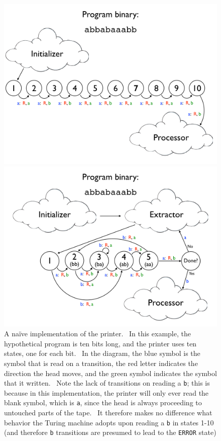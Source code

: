 \documentclass[11pt]{article}
\begin{document}
\begin{figure}
\begin{center}
\includegraphics[scale=0.28]{figs/naiveprog.png}
\caption{A na\"ive implementation of the printer. \ In this example, the hypothetical program is ten bits long, and the printer uses ten states, one for each bit. \ In the diagram, the blue symbol is the symbol that is read on a transition, the red letter indicates the direction the head moves, and the green symbol indicates the symbol that it written. \ Note the lack of transitions on reading a \texttt{b}; this is because in this implementation, the printer will only ever read the blank symbol, which is \texttt{a}, since the head is always proceeding to untouched parts of the tape. \ It therefore makes no difference what behavior the Turing machine adopts upon reading a \texttt{b} in states 1-10 (and therefore \texttt{b} transitions are presumed to lead to the \texttt{ERROR} state) \label{fig:naiveprog}}
\includegraphics[scale=0.28]{figs/introspectprog.png}

\end{center}
\end{figure}
\end{document}
